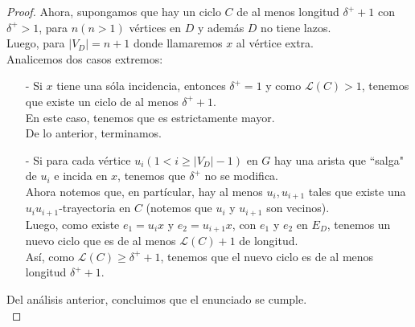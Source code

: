 \documentclass{article}
\begin{document}
\begin{enumerate}
\begin{proof}
      Ahora, supongamos que hay un ciclo $C$ de al menos longitud $\delta^+ +1$
      con $\delta^+ > 1$, para $n(n > 1)$ vértices en $D$ y además $D$ no
      tiene lazos. \\
      Luego, para $|V_D| = n +1$ donde llamaremos $x$ al vértice
      extra. \\
      Analicemos dos casos extremos:

      \begin{itemize}
        \item[-] Si $x$ tiene una sóla incidencia, entonces $\delta^+ = 1$ y como
          $\mathcal{L}(C) > 1$, tenemos que existe un ciclo de al menos $\delta^+ +1$. \\
          En este caso, tenemos que es estrictamente mayor. \\
          De lo anterior, terminamos. \\

        \item[-] Si para cada vértice $u_i(1 < i \geq |V_D| -1)$ en $G$ hay
          una arista que ``salga" de $u_i$ e incida en $x$, tenemos que $\delta^+$
          no se modifica. \\
          Ahora notemos que, en partícular, hay al menos
          $u_i, u_{i +1}$ tales que existe una $u_i u_{i +1}$-trayectoria en $C$
          (notemos que $u_i$ y $u_{i +1}$ son vecinos). \\
          Luego, como existe $e_1 = u_i x$ y $e_{2} = u_{i +1} x$, con $e_1$
          y $e_2$ en $E_D$, tenemos un nuevo ciclo que es de al menos
          $\mathcal{L}(C) +1$ de longitud. \\
          Así, como $\mathcal{L}(C) \geq \delta^+ +1$, tenemos que el nuevo ciclo es
          de al menos longitud $\delta^+ +1$.
      \end{itemize}
      Del análisis anterior, concluimos que el enunciado se cumple. \\
    \end{proof}
  \end{enumerate}
\end{document}
